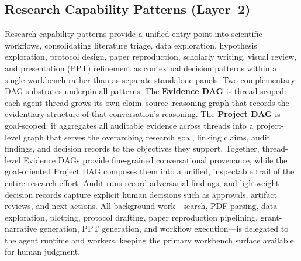 \documentclass[sn-basic,Numbered,pdflatex]{sn-jnl}
\begin{document}
\subsection{Research Capability Patterns (Layer~2)}
Research capability patterns provide a unified entry point into scientific workflows, consolidating literature triage, data exploration, hypothesis exploration, protocol design, paper reproduction, scholarly writing, visual review, and presentation (PPT) refinement as contextual decision patterns within a single workbench rather than as separate standalone panels. Two complementary DAG substrates underpin all patterns. The \textbf{Evidence DAG} is thread-scoped: each agent thread grows its own claim--source--reasoning graph that records the evidentiary structure of that conversation's reasoning. The \textbf{Project DAG} is goal-scoped: it aggregates all auditable evidence across threads into a project-level graph that serves the overarching research goal, linking claims, audit findings, and decision records to the objectives they support. Together, thread-level Evidence DAGs provide fine-grained conversational provenance, while the goal-oriented Project DAG composes them into a unified, inspectable trail of the entire research effort. Audit runs record adversarial findings, and lightweight decision records capture explicit human decisions such as approvals, artifact reviews, and next actions. All background work---search, PDF parsing, data exploration, plotting, protocol drafting, paper reproduction pipelining, grant-narrative generation, PPT generation, and workflow execution---is delegated to the agent runtime and workers, keeping the primary workbench surface available for human judgment.
\end{document}

